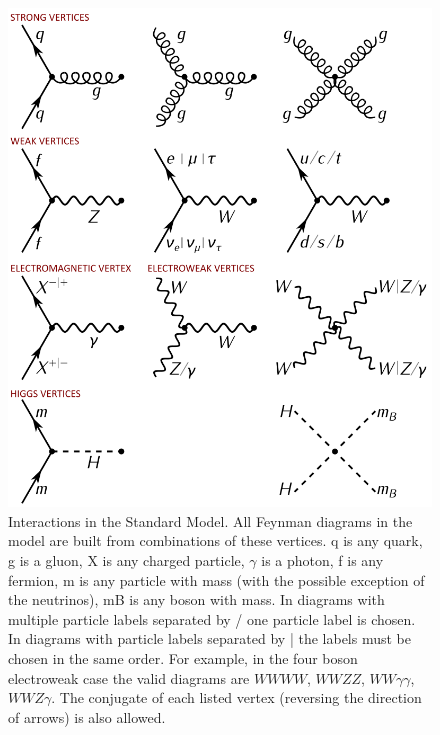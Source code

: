\begin{figure}[!ht]
    \vspace*{-0.0cm}
    \centering
    \setlength{\mylength}{\textwidth}
    \includegraphics[width=0.7\mylength]{resources/SM_Feynman_vertices.png}
    \vspace*{-0.0cm}
    \caption{Interactions in the Standard Model. All Feynman diagrams in the model are built from combinations of these vertices. q is any quark, g is a gluon, X is any charged particle, $\gamma$ is a photon, f is any fermion, m is any particle with mass (with the possible exception of the neutrinos), mB is any boson with mass. In diagrams with multiple particle labels separated by / one particle label is chosen. In diagrams with particle labels separated by | the labels must be chosen in the same order. For example, in the four boson electroweak case the valid diagrams are $WWWW$, $WWZZ$, $WW\gamma\gamma$, $WWZ\gamma$. The conjugate of each listed vertex (reversing the direction of arrows) is also allowed.}
    \label{fig:SM_vertices}
    \vspace*{-0.0cm}
\end{figure}

